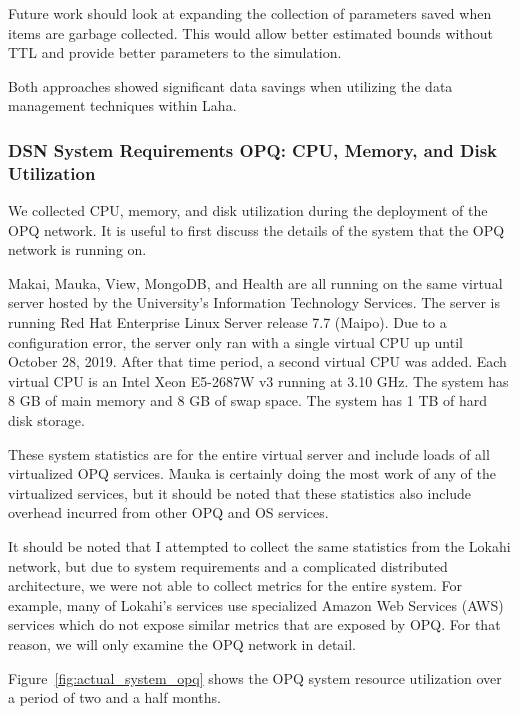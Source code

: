 Future work should look at expanding the collection of parameters saved when items are garbage collected. This would allow better estimated bounds without TTL and provide better parameters to the simulation.

Both approaches showed significant data savings when utilizing the data management techniques within Laha.

\subsubsection{DSN System Requirements OPQ: CPU, Memory, and Disk Utilization}

We collected CPU, memory, and disk utilization during the deployment of the OPQ network. It is useful to first discuss the details of the system that the OPQ network is running on.

Makai, Mauka, View, MongoDB, and Health are all running on the same virtual server hosted by the University's Information Technology Services. The server is running Red Hat Enterprise Linux Server release 7.7 (Maipo). Due to a configuration error, the server only ran with a single virtual CPU up until October 28, 2019. After that time period, a second virtual CPU was added. Each virtual CPU is an Intel Xeon E5-2687W v3 running at 3.10 GHz. The system has 8 GB of main memory and 8 GB of swap space. The system has 1 TB of hard disk storage.

These system statistics are for the entire virtual server and include loads of all virtualized OPQ services. Mauka is certainly doing the most work of any of the virtualized services, but it should be noted that these statistics also include overhead incurred from other OPQ and OS services.

It should be noted that I attempted to collect the same statistics from the Lokahi network, but due to system requirements and a complicated distributed architecture, we were not able to collect metrics for the entire system. For example, many of Lokahi's services use specialized Amazon Web Services (AWS) services which do not expose similar metrics that are exposed by OPQ. For that reason, we will only examine the OPQ network in detail.

Figure~\ref{fig:actual_system_opq} shows the OPQ system resource utilization over a period of two and a half months.

